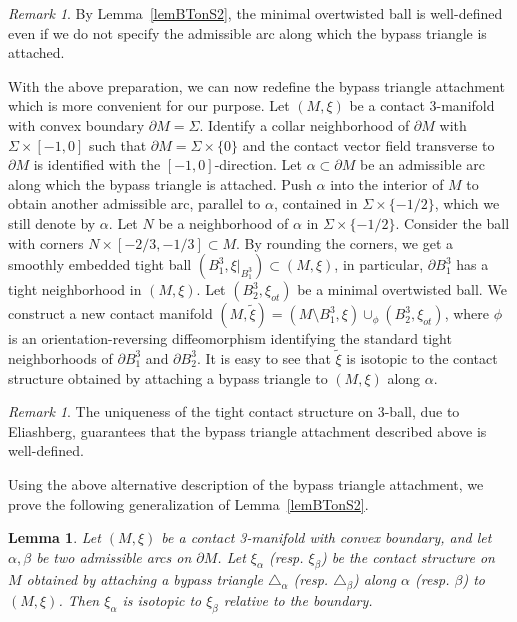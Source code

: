 \documentclass[12pt]{amsart}
\newtheorem{lemma}[thm]{Lemma}
\theoremstyle{remark}
\newtheorem{rmk}[thm]{Remark}
\newcommand{\bdry}{\partial}
\begin{document}
\begin{rmk}
By Lemma~\ref{lemBTonS2}, the minimal overtwisted ball is well-defined even if we do not specify the admissible arc along which the bypass triangle is attached.
\end{rmk}

With the above preparation, we can now redefine the bypass triangle attachment which is more convenient for our purpose. Let $(M,\xi)$ be a contact 3-manifold with convex boundary $\bdry M=\Sigma$. Identify a collar neighborhood of $\bdry M$ with $\Sigma\times[-1,0]$ such that $\bdry M=\Sigma\times\{0\}$ and the contact vector field transverse to $\bdry M$ is identified with the $[-1,0]$-direction. Let $\alpha\subset\bdry M$ be an admissible arc along which the bypass triangle is attached. Push $\alpha$ into the interior of $M$ to obtain another admissible arc, parallel to $\alpha$, contained in $\Sigma\times\{-1/2\}$, which we still denote by $\alpha$. Let $N$ be a neighborhood of $\alpha$ in $\Sigma\times\{-1/2\}$. Consider the ball with corners $N\times[-2/3,-1/3]\subset M$. By rounding the corners, we get a smoothly embedded tight ball $(B^3_1,\xi|_{B^3_1})\subset(M,\xi)$, in particular, $\bdry B^3_1$ has a tight neighborhood in $(M,\xi)$. Let $(B^3_2,\xi_{ot})$ be a minimal overtwisted ball. We construct a new contact manifold $(M,\tilde\xi)=(M\setminus B^3_1,\xi)\cup_\phi(B^3_2,\xi_{ot})$, where $\phi$ is an orientation-reversing diffeomorphism identifying the standard tight neighborhoods of $\bdry B^3_1$ and $\bdry B^3_2$. It is easy to see that $\tilde\xi$ is isotopic to the contact structure obtained by attaching a bypass triangle to $(M,\xi)$ along $\alpha$.

\begin{rmk}
The uniqueness of the tight contact structure on 3-ball, due to Eliashberg, guarantees that the bypass triangle attachment described above is well-defined.
\end{rmk}

Using the above alternative description of the bypass triangle attachment, we prove the following generalization of Lemma~\ref{lemBTonS2}.

\begin{lemma} \label{LemBT}
Let $(M,\xi)$ be a contact 3-manifold with convex boundary, and let $\alpha,\beta$ be two admissible arcs on $\bdry M$. Let $\xi_\alpha$ (resp. $\xi_\beta$) be the contact structure on $M$ obtained by attaching a bypass triangle $\triangle_\alpha$ (resp. $\triangle_\beta$) along $\alpha$ (resp. $\beta$) to $(M,\xi)$. Then $\xi_\alpha$ is isotopic to $\xi_\beta$ relative to the boundary.
\end{lemma}
\end{document}
